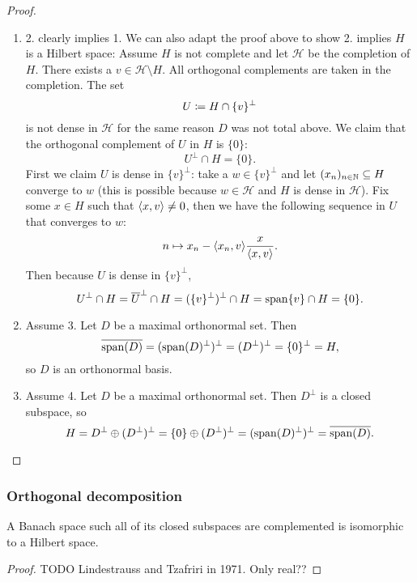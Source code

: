 \begin{proof}
\begin{enumerate}
\item 2. clearly implies 1. We can also adapt the proof above to show 2. implies $H$ is a Hilbert space:
Assume $H$ is not complete and let $\mathcal{H}$ be the completion of $H$. There exists a $v\in \mathcal{H}\setminus H$. All orthogonal complements are taken in the completion.
The set
\[ U \coloneqq H\cap\{v\}^\perp \]
is not dense in $\mathcal{H}$ for the same reason $D$ was not total above. We claim that the orthogonal complement of $U$ in $H$ is $\{0\}$:
\[ U^\perp\cap H = \{0\}. \]
First we claim $U$ is dense in $\{v\}^\perp$: take a $w\in \{v\}^\perp$ and let $(x_n)_{n\in\mathbb{N}}\subseteq H$ converge to $w$ (this is possible because $w\in\mathcal{H}$ and $H$ is dense in $\mathcal{H}$). Fix some $x\in H$ such that $\inner{x,v}\neq 0$, then we have the following sequence in $U$ that converges to $w$:
\[ n\mapsto x_n - \inner{x_n,v}\frac{x}{\inner{x,v}}. \]
Then because $U$ is dense in $\{v\}^\perp$,
\[ U^\perp\cap H = \overline{U}^\perp\cap H = (\{v\}^\perp)^\perp \cap H = \operatorname{span}\{v\}\cap H = \{0\}. \]
\item Assume 3. Let $D$ be a maximal orthonormal set. Then
\[ \overline{\operatorname{span}(D)} = (\operatorname{span}(D)^\perp)^\perp = (D^\perp)^\perp = \{0\}^\perp = H, \]
so $D$ is an orthonormal basis.
\item Assume 4. Let $D$ be a maximal orthonormal set. Then $D^\perp$ is a closed subspace, so
\[ H  = D^\perp \oplus (D^\perp)^\perp = \{0\} \oplus (D^\perp)^\perp = (\operatorname{span}(D)^\perp)^\perp = \overline{\operatorname{span}(D)}. \]
\end{enumerate}
\end{proof}

\subsubsection{Orthogonal decomposition}
\begin{theorem}
 A Banach space such all of its closed subspaces are complemented is isomorphic to a Hilbert space.
\end{theorem}
\begin{proof}
TODO Lindestrauss and Tzafriri in 1971. Only real??
\end{proof}

